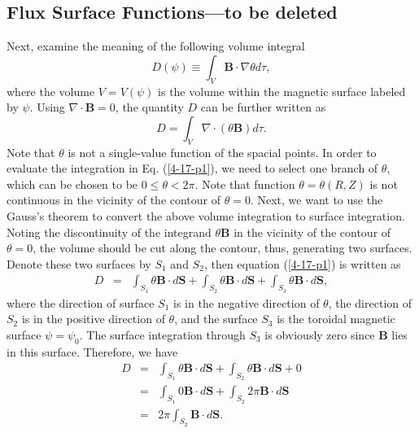 \documentclass{llncs}
\begin{document}
\subsection{Flux Surface Functions---to be deleted}\label{7-25-e1}

Next, examine the meaning of the following volume integral
\begin{equation}
  D (\psi) \equiv \int_V \mathbf{B} \cdot \nabla \theta d \tau,
\end{equation}
where the volume $V = V (\psi)$ is the volume within the magnetic surface
labeled by $\psi$. Using $\nabla \cdot \mathbf{B}= 0$, the quantity $D$ can be
further written as
\begin{equation}
  \label{4-17-p1} D = \int_V \nabla \cdot (\theta \mathbf{B}) d \tau .
\end{equation}
Note that $\theta$ is not a single-value function of the spacial points. In
order to evaluate the integration in Eq. (\ref{4-17-p1}), we need to select
one branch of $\theta$, which can be chosen to be $0 \leqslant \theta < 2
\pi$. Note that function $\theta = \theta (R, Z)$ is not continuous in the
vicinity of the contour of $\theta = 0$. Next, we want to use the Gauss's
theorem to convert the above volume integration to surface integration. Noting
the discontinuity of the integrand $\theta \mathbf{B}$ in the vicinity of the
contour of $\theta = 0$, the volume should be cut along the contour, thus,
generating two surfaces. Denote these two surfaces by $S_1$ and $S_2$, then
equation (\ref{4-17-p1}) is written as
\begin{eqnarray*}
  D & = & \int_{S_1} \theta \mathbf{B} \cdot d\mathbf{S}+ \int_{S_2} \theta
  \mathbf{B} \cdot d\mathbf{S}+ \int_{S_3} \theta \mathbf{B} \cdot
  d\mathbf{S},
\end{eqnarray*}
where the direction of surface $S_1$ is in the negative direction of $\theta$,
the direction of $S_2$ is in the positive direction of $\theta$, and the
surface $S_3$ is the toroidal magnetic surface $\psi = \psi_0$. The surface
integration through $S_3$ is obviously zero since $\mathbf{B}$ lies in this
surface. Therefore, we have
\begin{eqnarray}
  D & = & \int_{S_1} \theta \mathbf{B} \cdot d\mathbf{S}+ \int_{S_2} \theta
  \mathbf{B} \cdot d\mathbf{S}+ 0 \nonumber\\
  & = & \int_{S_1} 0\mathbf{B} \cdot d\mathbf{S}+ \int_{S_2} 2 \pi \mathbf{B}
  \cdot d\mathbf{S} \nonumber\\
  & = & 2 \pi \int_{S_2} \mathbf{B} \cdot d\mathbf{S}.  \label{4-18-4}
\end{eqnarray}
\end{document}
